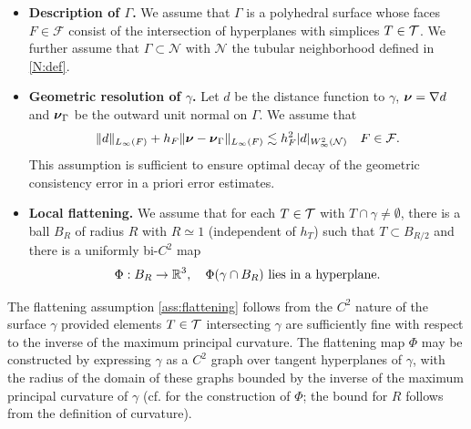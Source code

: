 \begin{itemize} 
\item {\bf Description of $\Gamma$.}  We assume that $\Gamma$ is a polyhedral surface whose faces $F\in\mathcal{F}$ consist of the intersection of hyperplanes with simplices $T\in\mathcal{T}$. We further assume that $\Gamma \subset \mathcal{N}$ with $\mathcal{N}$ the tubular neighborhood defined in \eqref{N:def}.
\item {\bf Geometric resolution of $\gamma$.}  Let $d$ be the distance function to $\gamma$, ${\boldsymbol \nu} = \nabla d$ and ${\boldsymbol \nu}_\Gamma$ be the outward unit normal on $\Gamma$.  We assume that
\begin{align}
\label{trace:geo_res_assumption}
\|d\|_{L_\infty(F)} + h_F \|{\boldsymbol \nu}-{\boldsymbol \nu}_\Gamma\|_{L_\infty(F)}
\lesssim h_F^2 |d|_{W^2_\infty(\mathcal{N})}
\quad F \in \mathcal{F}.
\end{align}
This assumption is sufficient to ensure optimal decay of the geometric consistency error in a priori error estimates.  
\item {\bf Local flattening.}  We assume that for each $T \in \mathcal{T}$ with $T \cap \gamma \neq \emptyset$, there is a ball $B_R$ of radius $R$ with $R \simeq 1$ (independent of $h_T$) such that $T \subset B_{R/2}$ and there is a uniformly bi-$C^2$ map
\begin{align}
\label{ass:flattening}
\Phi:B_R \rightarrow \mathbb{R}^3, \quad \Phi(\gamma \cap B_R) \hbox{ lies in a hyperplane.}
\end{align}
\end{itemize} 

The flattening assumption \eqref{ass:flattening} follows from the $C^2$ nature of the surface $\gamma$ provided elements $T\in\mathcal{T}$ intersecting $\gamma$ are sufficiently fine with respect to the inverse of the maximum principal curvature. The flattening map $\Phi$ may be constructed by expressing $\gamma$ as a $C^2$ graph over tangent hyperplanes of $\gamma$, with the radius of the domain of these graphs bounded by the inverse of the maximum principal curvature of $\gamma$ (cf. \cite[Appendix C]{Ev98} for the construction of $\Phi$; the bound for $R$ follows from the definition of curvature).

